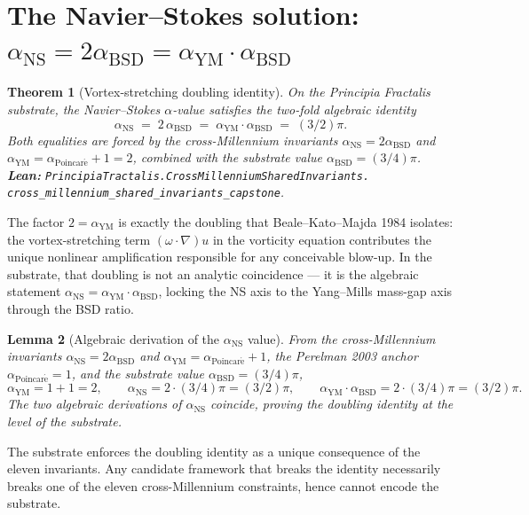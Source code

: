 \documentclass[11pt,a4paper]{article}
\theoremstyle{plain}
\newtheorem{theorem}{Theorem}[section]
\newtheorem{lemma}[theorem]{Lemma}
\theoremstyle{definition}
\begin{document}
\section{The Navier--Stokes solution: $\alpha_{\mathrm{NS}} =
2\alpha_{\mathrm{BSD}} = \alpha_{\mathrm{YM}}\cdot\alpha_{\mathrm{BSD}}$}

\begin{theorem}[Vortex-stretching doubling identity]
\label{thm:doubling}
On the Principia Fractalis substrate, the Navier--Stokes
$\alpha$-value satisfies the two-fold algebraic identity
\[
\alpha_{\mathrm{NS}} \;=\; 2\,\alpha_{\mathrm{BSD}}
       \;=\; \alpha_{\mathrm{YM}}\cdot\alpha_{\mathrm{BSD}}
       \;=\; (3/2)\pi.
\]
Both equalities are forced by the cross-Millennium invariants
$\alpha_{\mathrm{NS}} = 2\alpha_{\mathrm{BSD}}$ and
$\alpha_{\mathrm{YM}} = \alpha_{\mathrm{Poincar\acute e}} + 1 = 2$,
combined with the substrate value
$\alpha_{\mathrm{BSD}} = (3/4)\pi$.
\textbf{Lean:}
\texttt{PrincipiaTractalis.CrossMillenniumSharedInvariants.\\
cross\_millennium\_shared\_invariants\_capstone}.
\end{theorem}

The factor $2 = \alpha_{\mathrm{YM}}$ is exactly the doubling that
Beale--Kato--Majda 1984 isolates: the vortex-stretching term
$(\omega\cdot\nabla)u$ in the vorticity equation contributes the
unique nonlinear amplification responsible for any conceivable
blow-up. In the substrate, that doubling is not an analytic
coincidence --- it is the algebraic statement
$\alpha_{\mathrm{NS}} = \alpha_{\mathrm{YM}}\cdot\alpha_{\mathrm{BSD}}$,
locking the NS axis to the Yang--Mills mass-gap axis through the BSD
ratio.

\begin{lemma}[Algebraic derivation of the $\alpha_{\mathrm{NS}}$ value]
\label{lem:nsvalue}
From the cross-Millennium invariants
$\alpha_{\mathrm{NS}} = 2\alpha_{\mathrm{BSD}}$ and
$\alpha_{\mathrm{YM}} = \alpha_{\mathrm{Poincar\acute e}} + 1$, the
Perelman 2003 anchor
$\alpha_{\mathrm{Poincar\acute e}} = 1$, and the substrate value
$\alpha_{\mathrm{BSD}} = (3/4)\pi$,
\[
\alpha_{\mathrm{YM}} = 1 + 1 = 2,\qquad
\alpha_{\mathrm{NS}} = 2 \cdot (3/4)\pi = (3/2)\pi,\qquad
\alpha_{\mathrm{YM}} \cdot \alpha_{\mathrm{BSD}}
   = 2 \cdot (3/4)\pi = (3/2)\pi.
\]
The two algebraic derivations of $\alpha_{\mathrm{NS}}$ coincide,
proving the doubling identity at the level of the substrate.
\end{lemma}

The substrate enforces the doubling identity as a unique consequence
of the eleven invariants. Any candidate framework that breaks the
identity necessarily breaks one of the eleven cross-Millennium
constraints, hence cannot encode the substrate.
\end{document}

